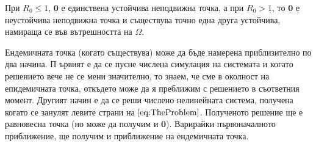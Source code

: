 При $R_0 \leq 1$, $\mathbf{0}$ е единствена устойчива неподвижна точка, а при $R_0 > 1$, то $\mathbf{0}$ е неустойчива неподвижна точка и съществува точно една друга устойчива, намираща се във вътрешността на $\Omega$.

Ендемичната точка (когато съществува) може да бъде намерена приблизително по два начина. П
ървият е да се пусне числена симулация на системата и когато решението вече не се мени значително, то знаем, че сме в околност на епидемичната точка, откъдето може да я преближим с решението в съответния момент.
Другият начин е да се реши числено нелинейната система, получена когато се занулят левите страни на $\ref{eq:TheProblem}$. Полученото решение ще е равновесна точка (но може да получим и $\mathbf{0}$). Варирайки първоначалното приближение, ще получим и приближение на ендемичната точка.
